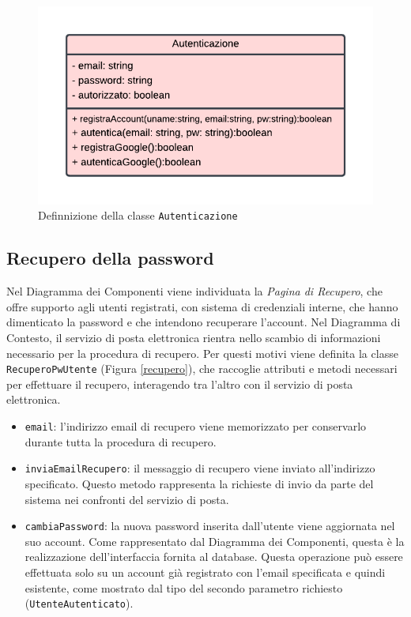 \documentclass[11pt, a4paper]{article}
\theoremstyle{definition} %
\begin{document}
\begin{figure}[H]
\centering
\includegraphics[scale = 0.9]{materiale/class-autenticazione.pdf}
\caption{Definnizione della classe \texttt{Autenticazione}}
\label{autenticaz}
\end{figure}

\newpage
\subsection{Recupero della password}
Nel Diagramma dei Componenti viene individuata la \textit{Pagina di Recupero},
che offre supporto agli utenti registrati, con sistema di credenziali interne,
che hanno dimenticato la password e che intendono recuperare l'account.
Nel Diagramma di Contesto, il servizio di posta elettronica rientra nello
scambio di informazioni necessario per la procedura di recupero. Per
questi motivi viene definita la classe \texttt{RecuperoPwUtente} (Figura \ref{recupero}), che
raccoglie attributi e metodi necessari per effettuare il recupero,
interagendo tra l'altro con il servizio di posta elettronica.

\begin{itemize}
    \item \texttt{email}: l'indirizzo email di recupero viene memorizzato
    per conservarlo durante tutta la procedura di recupero.

    \item \texttt{inviaEmailRecupero}: il messaggio di recupero viene inviato
    all'indirizzo specificato. Questo metodo rappresenta la richieste di
    invio da parte del sistema nei confronti del servizio di posta.

    \item \texttt{cambiaPassword}: la nuova password inserita dall'utente
    viene aggiornata nel suo account. Come rappresentato dal Diagramma dei
    Componenti, questa è la realizzazione dell'interfaccia fornita al
    database. Questa operazione può essere effettuata solo su un account
    già registrato con l'email specificata e quindi esistente, come
    mostrato dal tipo del secondo parametro richiesto
    (\texttt{UtenteAutenticato}).
\end{itemize}
\end{document}
